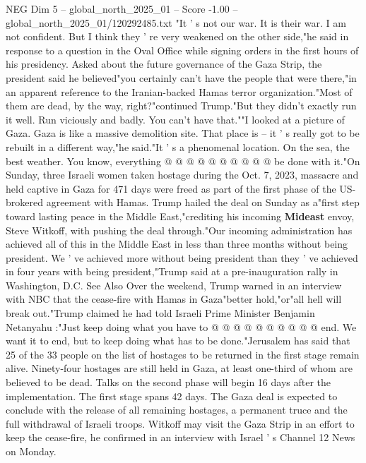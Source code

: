 \begin{textsample}{NEG Dim 5 – global\_north\_2025\_01 – Score -1.00 – global\_north\_2025\_01/120292485.txt}  \label{ex:f5_neg_078}
"It ' s not our war.
It is their war.
I am not confident.
But I think they ' re very weakened on the other side,"he said in response to a question in the Oval Office while signing orders in the first hours of his presidency.
Asked about the future governance of the Gaza Strip, the president said he believed"you certainly can't have the people that were there,"in an apparent reference to the Iranian-backed Hamas terror organization."Most of them are dead, by the way, right?"continued Trump."But they didn't exactly run it well.
Run viciously and badly.
You can't have that.""I looked at a picture of Gaza.
Gaza is like a massive demolition site.
That place is -- it ' s really got to be rebuilt in a different way,"he said."It ' s a phenomenal location.
On the sea, the best weather.
You know, everything @ @ @ @ @ @ @ @ @ @ be done with it."On Sunday, three Israeli women taken hostage during the Oct. 7, 2023, massacre and held captive in Gaza for 471 days were freed as part of the first phase of the US-brokered agreement with Hamas.
Trump hailed the deal on Sunday as a"first step toward lasting peace in the Middle East,"crediting his incoming \textbf{Mideast} envoy, Steve Witkoff, with pushing the deal through."Our incoming administration has achieved all of this in the Middle East in less than three months without being president.
We ' ve achieved more without being president than they ' ve achieved in four years with being president,"Trump said at a pre-inauguration rally in Washington, D.C.
See Also Over the weekend, Trump warned in an interview with NBC that the cease-fire with Hamas in Gaza"better hold,"or"all hell will break out."Trump claimed he had told Israeli Prime Minister Benjamin Netanyahu :"Just keep doing what you have to @ @ @ @ @ @ @ @ @ @ end.
We want it to end, but to keep doing what has to be done."Jerusalem has said that 25 of the 33 people on the list of hostages to be returned in the first stage remain alive.
Ninety-four hostages are still held in Gaza, at least one-third of whom are believed to be dead.
Talks on the second phase will begin 16 days after the implementation.
The first stage spans 42 days.
The Gaza deal is expected to conclude with the release of all remaining hostages, a permanent truce and the full withdrawal of Israeli troops.
Witkoff may visit the Gaza Strip in an effort to keep the cease-fire, he confirmed in an interview with Israel ' s Channel 12 News on Monday.

\end{textsample}
